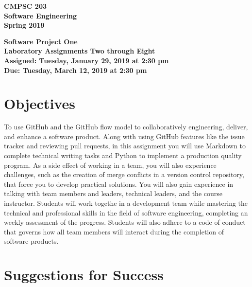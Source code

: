 \documentclass[11pt]{article}
\newcommand{\assignmentduedate}{March 12}
\newcommand{\assignmentassignedate}{January 29}
\newcommand{\assignmentnumber}{One}
\newcommand{\labassignmentnumberstart}{Two}
\newcommand{\labassignmentnumberend}{Eight}
\newcommand{\labyear}{2019}
\newcommand{\labdueday}{Tuesday}
\newcommand{\labassignday}{Tuesday}
\newcommand{\labtime}{2:30 pm}
\newcommand{\assigneddate}{Assigned: \labassignday, \assignmentassignedate, \labyear{} at \labtime{}}
\newcommand{\duedate}{Due: \labdueday, \assignmentduedate, \labyear{} at \labtime{}}
\newcommand{\labtitle}[1]
{
  \begin{center}
    \begin{center}
      \bf
      CMPSC 203\\Software Engineering\\
      Spring 2019\\
      \medskip
    \end{center}
    \bf
    #1
  \end{center}
}
\begin{document}
\thispagestyle{empty}

\labtitle{Software Project \assignmentnumber{} \\ Laboratory Assignments \labassignmentnumberstart{} through \labassignmentnumberend{} \\ \assigneddate{} \\ \duedate{}}

\section*{Objectives}

To use GitHub and the GitHub flow model to collaboratively engineering, deliver,
and enhance a software product.
%
Along with using GitHub features like the issue tracker and reviewing pull
requests, in this assignment you will use Markdown to complete technical writing
tasks and Python to implement a production quality program.
%
As a side effect of working in a team, you will also experience challenges, such
as the creation of merge conflicts in a version control repository, that force
you to develop practical solutions.
%
You will also gain experience in talking with team members and leaders,
technical leaders, and the course instructor.
%
Students will work togethe in a development team while mastering the technical
and professional skills in the field of software engineering, completing an
weekly assessment of the progress.
%
Students will also adhere to a code of conduct that governs how all team members
will interact during the completion of software products.

\section*{Suggestions for Success}
\end{document}
